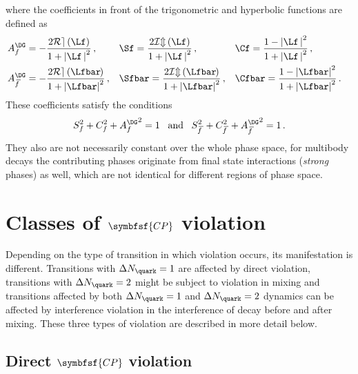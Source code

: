 where the coefficients in front of the trigonometric and hyperbolic functions are defined as
\begin{align}
&A_f^{\DG}=-\frac{2\mathcal{Re}\left(\Lf\right)}{1+\left|\Lf\,\right|^2}\,,&
&\Sf=\frac{2\mathcal{Im}\left(\Lf\right)}{1+\left|\Lf\,\right|^2}\,,&
&\Cf=\frac{1-\left|\Lf\,\right|^2}{1+\left|\Lf\,\right|^2}\,,&\label{eq:cpcoeff}\\
&A_{\kern 1.5pt\overline{\kern -1.5pt f\kern 1.5pt}}^{\DG}=-\frac{2\mathcal{Re}\left(\Lfbar\kern -0.1em\right)}{1+\left|\Lfbar\right|^2}\,,&
&\Sfbar=\frac{2\mathcal{Im}\left(\Lfbar\kern -0.1em\right)}{1+\left|\Lfbar\right|^2}\,,&
&\Cfbar=\frac{1-\left|\Lfbar\right|^2}{1+\left|\Lfbar\right|^2}\,.&\label{eq:cpcoeffbar}
\end{align}
These coefficients satisfy the conditions
\begin{equation}
S_{f}^2+C_{f}^2+{A_f^{\DG}}^2=1\,\,\,\,\,\text{and}\,\,\,\,\,S_{\kern 1.5pt\overline{\kern -1.5pt f\kern 1.5pt}}^2+C_{\kern 1.5pt\overline{\kern -1.5pt f\kern 1.5pt}}^2+{A_{\kern 1.5pt\overline{\kern -1.5pt f\kern 1.5pt}}^{\DG}}^2=1\,.\label{eq:CpCoeffCond}
\end{equation}
They also are not necessarily constant over the whole phase space, \ie for multibody decays the contributing phases originate from final state interactions (\ie \emph{strong} phases) as well, which are not identical for different regions of phase space.

\section[head={Classes of \CP violation},tocentry={Classes of \CP violation}]{Classes of $\symbfsf{C{}P}$ violation}
\label{sec:CPVClasses}

Depending on the type of transition in which \CP violation occurs, its manifestation is different.
Transitions with $\Delta N_\quark=1$ are affected by direct \CP violation, transitions with $\Delta N_\quark=2$ might be subject to \CP violation in mixing and
transitions affected by both $\Delta N_\quark=1$ and $\Delta N_\quark=2$ dynamics can be affected by interference \CP violation in the interference of decay before and after mixing.
These three types of \CP violation are described in more detail below.


\subsection[head={Direct \CP violation},tocentry={Direct \CP violation}]{Direct $\symbfsf{C{}P}$ violation}
\label{sec:DirectCPV}

